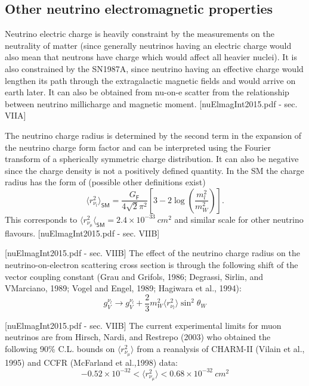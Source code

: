\subsection{Other neutrino electromagnetic properties}\label{sec:otherNuElmagProperties}

Neutrino electric charge is heavily constraint by the measurements on the neutrality of matter (since generally neutrinos having an electric charge would also mean that neutrons have charge which would affect all heavier nuclei). It is also constrained by the SN1987A, since neutrino having an effective charge would lengthen its path through the extragalactic magnetic fields and would arrive on earth later. It can also be obtained from nu-on-e scatter from the relationship between neutrino millicharge and magnetic moment. [nuElmagInt2015.pdf - sec. VIIA]

The neutrino charge radius is determined by the second term in the expansion of the neutrino charge form factor and can be interpreted using the Fourier transform of a spherically symmetric charge distribution. It can also be negative since the charge density is not a positively defined quantity. In the SM the charge radius has the form of (possible other definitions exist)
\begin{equation}
\langle r_{\nu_l}^2\rangle_{\textsf{SM}}=\frac{G_{\textsf{F}}}{4\sqrt{2}\pi^2}\left[3-2\log\left(\frac{m_l^2}{m_W^2}\right)\right].
\end{equation}
This corresponds to $\langle r_{\nu_{\mu}}^2\langle_{\textsf{SM}}=2.4\times 10^{-33}\ \unit{cm^2}$ and similar scale for other neutrino flavours. [nuElmagInt2015.pdf - sec. VIIB]

[nuElmagInt2015.pdf - sec. VIIB]
The effect of the neutrino charge radius on the neutrino-on-electron scattering cross section is through the following shift of the vector coupling constant (Grau and Grifols, 1986; Degrassi, Sirlin, and VMarciano, 1989; Vogel and Engel, 1989; Hagiwara et al., 1994):
\begin{equation}
g_V^{\nu_l}\rightarrow g_V^{\nu_l}+\frac{2}{3}m_W^2\langle r_{\nu_l}^2\rangle\sin^2\theta_W
\end{equation}

[nuElmagInt2015.pdf - sec. VIIB]
The current experimental limits for muon neutrinos are from   Hirsch, Nardi, and Restrepo (2003) who obtained the
following 90\% C.L. bounds on $\langle r_{\nu_\mu}^2\rangle$ from a reanalysis of
CHARM-II (Vilain et al., 1995) and CCFR (McFarland et al.,1998) data:
\begin{equation}
-0.52\times 10^{-32}<\langle r_{\nu_\mu}^2\rangle<0.68\times 10^{-32}\ \unit{cm^2}
\end{equation}

